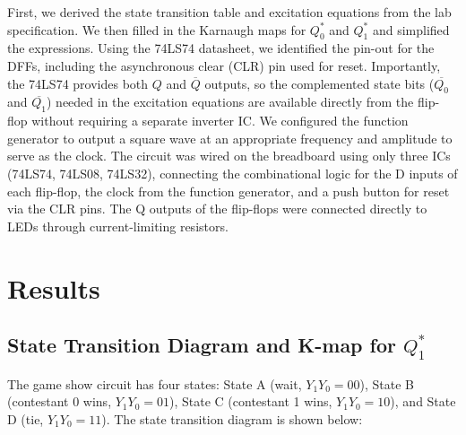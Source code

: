 \documentclass[12pt, letterpaper]{article}
\begin{document}
First, we derived the state transition table and excitation equations from the lab specification. We then filled in the Karnaugh maps for $Q_0^*$ and $Q_1^*$ and simplified the expressions. Using the 74LS74 datasheet, we identified the pin-out for the DFFs, including the asynchronous clear (CLR) pin used for reset. Importantly, the 74LS74 provides both $Q$ and $\overline{Q}$ outputs, so the complemented state bits ($\overline{Q_0}$ and $\overline{Q_1}$) needed in the excitation equations are available directly from the flip-flop without requiring a separate inverter IC. We configured the function generator to output a square wave at an appropriate frequency and amplitude to serve as the clock. The circuit was wired on the breadboard using only three ICs (74LS74, 74LS08, 74LS32), connecting the combinational logic for the D inputs of each flip-flop, the clock from the function generator, and a push button for reset via the CLR pins. The Q outputs of the flip-flops were connected directly to LEDs through current-limiting resistors.

\section{Results}

\subsection{State Transition Diagram and K-map for $Q_1^*$}

The game show circuit has four states: State A (wait, $Y_1Y_0 = 00$), State B (contestant 0 wins, $Y_1Y_0 = 01$), State C (contestant 1 wins, $Y_1Y_0 = 10$), and State D (tie, $Y_1Y_0 = 11$). The state transition diagram is shown below:
\end{document}
